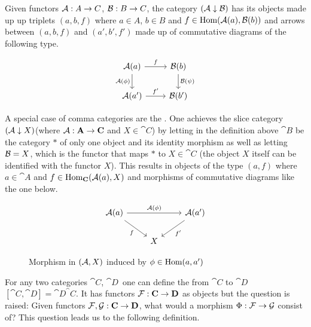 \documentclass[../../main.tex]{subfiles}
\begin{document}
    \begin{definition}
        Given functors $\mathcal{A}: A \to C$, $\mathcal{B}: B \to C$, the category $(\mathcal{A} \downarrow \mathcal{B})$ has its objects made up up triplets $(a, b, f)$ where $a \in A$, $b \in B$ and $f \in \text{Hom}(\mathcal{A}(a), \mathcal{B}(b))$ and arrows between $(a, b, f)$ and $(a', b', f')$ made up of commutative diagrams of the following type.
    \end{definition}

    \begin{figure}[H]
        \[
            \begin{tikzcd}
                \functor{A}(a) \arrow[r, "f"] \arrow[d, "\functor{A}(\phi)",swap]
                & \functor{B}(b) \arrow[d, "\functor{B}(\psi)"] \\
                \functor{A}(a') \arrow[r, "f'"]
                & \functor{B}(b')
            \end{tikzcd}
        \]
    \end{figure}

    A special case of comma categories are the . One achieves the slice category $(\mathcal{A} \downarrow X)$(where $\mathcal{A}: \mathbf{A} \to \mathbf{C}$ and $X \in \cat{C}$) by letting in the definition above $\cat{B}$ be the category $*$ of only one object and its identity morphism as well as letting $\mathcal{B}=X$, which is the functor that maps $*$ to $X \in \cat{C}$ (the object $X$ itself can be identified with the functor $X$). This results in objects of the type $(a, f)$ where $a \in \cat{A}$ and $f \in \text{Hom}_\mathbf{C}(\mathcal{A}(a), X)$ and morphisms of commutative diagrams like the one below.

    \begin{figure}[H]
        \[
            \begin{tikzcd}
                \functor{A}(a) \arrow[swap]{dr}{f} \arrow{rr}{\functor{A}(\phi)} && \functor{A}(a') \arrow{dl}{f'}\\
                & X
            \end{tikzcd}
        \]
        \caption{Morphism in $(\mathcal{A}, X)$ induced by $\phi \in \text{Hom}(a, a')$}
        \label{slice-cat}
    \end{figure}

    For any two categories $\cat{C}$, $\cat{D}$ one can define the  from $\cat{C}$ to $\cat{D}$ $[\cat{C}, \cat{D}] = \cat{D}^\cat{C}$. It has functors $\mathcal{F}: \mathbf{C} \to \mathbf{D}$ as objects but the question is raised: Given functors $\mathcal{F}, \mathcal{G}: \mathbf{C} \to \mathbf{D}$, what would a morphism $\Phi: \mathcal{F} \to \mathcal{G}$ consist of? This question leads us to the following definition.
\end{document}

